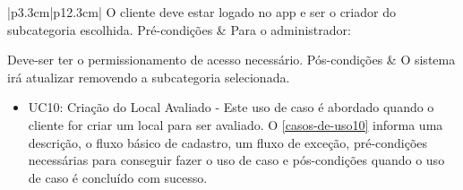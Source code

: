 \begin{longtable}{|p{3.3cm}|p{12.3cm}|}
	O cliente deve estar logado no app e ser o criador do subcategoria escolhida. 
	\hline
	Pré-condições & Para o administrador:
	
	Deve-ser ter o permissionamento de acesso necessário.
	\hline
	Pós-condições & O sistema irá atualizar removendo a subcategoria selecionada.\\
	\hline
\end{longtable}


\begin{itemize}
	\item UC10: Criação do Local Avaliado - Este uso de caso é abordado quando o cliente for criar um local para ser avaliado. O \autoref{casos-de-uso10} informa uma descrição, o fluxo básico de cadastro, um fluxo de exceção, pré-condições necessárias para conseguir fazer o uso de caso e pós-condições quando o uso de caso é concluído com sucesso.\\	
\end{itemize}


